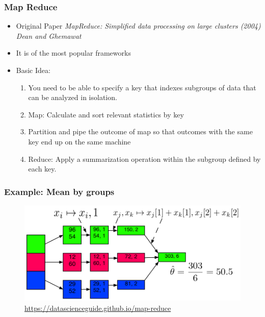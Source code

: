\documentclass[
  shownotes,
  xcolor={svgnames},
  hyperref={colorlinks,citecolor=DarkBlue,linkcolor=DarkRed,urlcolor=DarkBlue}
  , aspectratio=169]{beamer}
\begin{document}
\begin{frame}
\frametitle{Map Reduce}

\begin{itemize}
  \item  Original Paper {\it MapReduce: Simplified data processing on large clusters (2004) Dean and Ghemawat}
  \medskip 
  \item It is of the most popular frameworks 
  \medskip
  \item Basic Idea:

  
\begin{enumerate}
  \item You need to be able to specify a key that indexes subgroups of data that can be analyzed in isolation.
  \item Map: Calculate and sort relevant statistics by key
  \item Partition and pipe the outcome of map so that outcomes with the same key end up on the same machine
  \item Reduce: Apply a summarization operation within the subgroup defined by each key.
\end{enumerate}
\end{itemize}



   
\end{frame}

\begin{frame}
\frametitle{Example: Mean by groups}



\begin{figure}[H] \centering
  \centering
  \includegraphics[scale=0.65]{figures/sketch_model_example.png}
  \\
  \tiny \url{https://datascienceguide.github.io/map-reduce}
\end{figure}

\end{frame}
\end{document}
